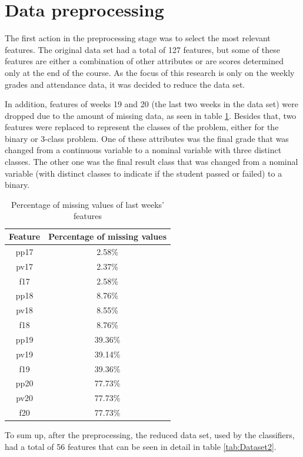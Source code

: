 \section{Data preprocessing}
The first action in the preprocessing stage was to select the most relevant features. The original data set had a total of 127 features, but some of these features are either a combination of other attributes or are scores determined only at the end of the course. As the focus of this research is only on the weekly grades and attendance data, it was decided to reduce the data set.

In addition, features of weeks 19 and 20 (the last two weeks in the data set) were dropped due to the amount of missing data, as seen in table \ref{tab:featmiss}. Besides that, two features were replaced to represent the classes of the problem, either for the binary or 3-class problem. One of these attributes was the final grade that was changed from a continuous variable to a nominal variable with three distinct classes. The other one was the final result class that was changed from a nominal variable (with distinct classes to indicate if the student passed or failed) to a binary.

\begin{table}[ht]
\centering
\begin{tabular}{cc} \hline
\textbf{Feature} & \textbf{Percentage of missing values} \\ \hline
pp17 & 2.58\% \\
pv17 & 2.37\% \\
f17 & 2.58\% \\
pp18 & 8.76\% \\
pv18 & 8.55\% \\
f18 & 8.76\% \\
pp19 & 39.36\% \\
pv19 & 39.14\% \\
f19 & 39.36\% \\
pp20 & 77.73\% \\
pv20 & 77.73\% \\
f20 & 77.73\% \\ \hline
\end{tabular}
\caption{Percentage of missing values of last weeks' features}
\label{tab:featmiss}
\end{table}

To sum up, after the preprocessing, the reduced data set, used by the classifiers, had a total of 56 features that can be seen in detail in table \ref{tab:Dataset2}.

